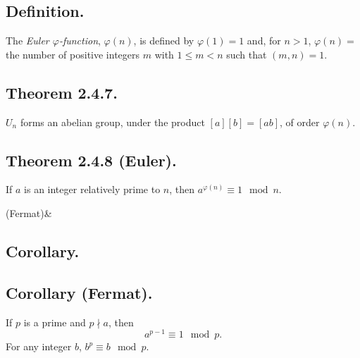 \documentclass{article}
\newenvironment{thm}[1]{\subsection*{Theorem #1.}}{}
\newenvironment{defn}{\subsection*{Definition.}}{}
\newenvironment{corollary}[1]{
    \def\temp{#1}\def\null{&}\ifx\temp\null
        \subsection*{Corollary.}
    \else
        \subsection*{Corollary #1.}
    \fi
    
}{}
\begin{document}
\begin{defn}
    The \textit{Euler $\varphi$-function}, $\varphi(n)$, is defined by $\varphi(1) = 1$ and,
    for $n > 1$, $\varphi(n) = $ the number of positive integers $m$ with $1 \leq m < n$ such that $(m, n) = 1$.
\end{defn}

\begin{thm}{2.4.7}
    $U_n$ forms an abelian group, under the product $[a][b] = [ab]$, of order $\varphi(n)$.
\end{thm}

\begin{thm}{2.4.8 (Euler)}
    If $a$ is an integer relatively prime to $n$, then $a^{\varphi(n)} \equiv 1 \mod n$.
\end{thm}

\begin{corollary}{(Fermat)}
    If $p$ is a prime and $p \nmid a$, then
    \[
        a^{p-1} \equiv 1 \mod p.
    \]
    For any integer $b$, $b^p \equiv b \mod p$.
\end{corollary}
 
\end{document}
